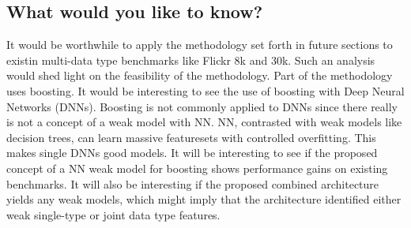 \subsection{What would you like to know?}

It would be worthwhile to apply the methodology set forth in future sections to existin multi-data type benchmarks like Flickr 8k and 30k.  Such an analysis would shed light on the feasibility of the methodology.  Part of the methodology uses boosting.  It would be interesting to see the use of boosting with Deep Neural Networks (DNNs).  Boosting is not commonly applied to DNNs since there really is not a concept of a weak model with NN.  NN, contrasted with weak models like decision trees, can learn massive featuresets with controlled overfitting.  This makes single DNNs good models.  It will be interesting to see if the proposed concept of a NN weak model for boosting shows performance gains on existing benchmarks.  It will also be interesting if the proposed combined architecture yields any weak models, which might imply that the architecture identified either weak single-type or joint data type features.



